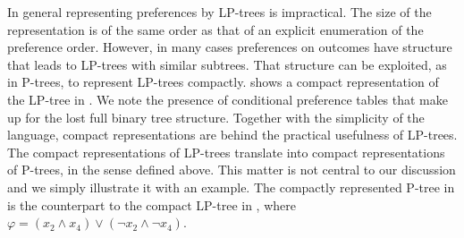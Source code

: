 In general representing preferences by LP-trees is impractical. The size of
the representation is of the same order as that of an explicit enumeration
of the preference order. However, in many cases preferences on outcomes 
have structure that leads to LP-trees with similar subtrees. That structure
can
be exploited, as in P-trees, to represent LP-trees compactly.  
 shows a compact representation of the LP-tree in  
. We note the presence of conditional preference tables 
that make up for the lost full binary tree structure. Together with the 
simplicity of the language, compact representations are behind the practical 
usefulness of LP-trees. The compact representations of LP-trees translate 
into compact representations of P-trees, in the sense defined above. This 
matter is not central to our discussion and we simply illustrate it with 
an example. The compactly represented P-tree in  is the
counterpart to the compact LP-tree in ,
where $\varphi=(x_2 \land x_4) \lor (\neg x_2 \land \neg x_4)$.

